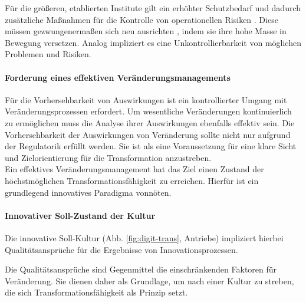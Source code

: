 Für die größeren, etablierten Institute gilt ein erhöhter Schutzbedarf \cite{recht/Bornemann2018} und dadurch zusätzliche Maßnahmen für die Kontrolle von operationellen Risiken \cite{MaRisk:2017, BAIT:2018}. Diese müssen gezwungenermaßen sich neu ausrichten \citet{Bussmann2006, Gupta:2017}, indem sie ihre hohe Masse in Bewegung versetzen. Analog impliziert es eine Unkontrollierbarkeit von möglichen Problemen und Risiken.

\paragraph{Forderung eines effektiven Veränderungsmanagements}
Für die Vorhersehbarkeit von Auswirkungen ist ein kontrollierter Umgang mit Veränderungsprozessen erfordert. Um wesentliche Veränderungen kontinuierlich zu ermöglichen muss die Analyse ihrer Auswirkungen \cite{MaRisk:2017} ebenfalls effektiv sein. Die Vorhersehbarkeit der Auswirkungen von Veränderung sollte nicht nur aufgrund der Regulatorik erfüllt werden. Sie ist als eine Voraussetzung für eine klare Sicht und Zielorientierung für die Transformation anzustreben.
\medskip
\\
Ein effektives Veränderungsmanagement hat das Ziel einen Zustand der höchstmöglichen Transformationsfähigkeit zu erreichen. Hierfür ist ein grundlegend innovatives Paradigma vonnöten. 

\paragraph{Innovativer Soll-Zustand der Kultur}
Die innovative Soll-Kultur (Abb. \ref{fig:digit-trans}, Antriebe) impliziert hierbei Qualitätsansprüche für die Ergebnisse von Innovationsprozessen.

Die Qualitätsansprüche sind Gegenmittel die einschränkenden Faktoren für Veränderung.
Sie dienen daher als Grundlage, um nach einer Kultur zu streben, die sich Transformationsfähigkeit als Prinzip setzt.

